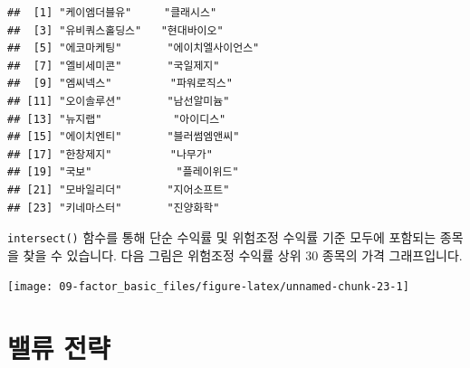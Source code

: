 \documentclass[12pt,]{book}
\newenvironment{Shaded}{\begin{snugshade}}{\end{snugshade}}
\newcommand{\DataTypeTok}[1]{\textcolor[rgb]{0.13,0.29,0.53}{#1}}
\newcommand{\KeywordTok}[1]{\textcolor[rgb]{0.13,0.29,0.53}{\textbf{#1}}}
\newcommand{\NormalTok}[1]{#1}
\newcommand{\OperatorTok}[1]{\textcolor[rgb]{0.81,0.36,0.00}{\textbf{#1}}}
\newcommand{\OtherTok}[1]{\textcolor[rgb]{0.56,0.35,0.01}{#1}}
\newcommand{\StringTok}[1]{\textcolor[rgb]{0.31,0.60,0.02}{#1}}
\begin{document}
\begin{verbatim}
##  [1] "케이엠더블유"     "클래시스"        
##  [3] "유비쿼스홀딩스"   "현대바이오"      
##  [5] "에코마케팅"       "에이치엘사이언스"
##  [7] "엘비세미콘"       "국일제지"        
##  [9] "엠씨넥스"         "파워로직스"      
## [11] "오이솔루션"       "남선알미늄"      
## [13] "뉴지랩"           "아이디스"        
## [15] "에이치엔티"       "블러썸엠앤씨"    
## [17] "한창제지"         "나무가"          
## [19] "국보"             "플레이위드"      
## [21] "모바일리더"       "지어소프트"      
## [23] "키네마스터"       "진양화학"
\end{verbatim}

\texttt{intersect()} 함수를 통해 단순 수익률 및 위험조정 수익률 기준 모두에 포함되는 종목을 찾을 수 있습니다. 다음 그림은 위험조정 수익률 상위 30 종목의 가격 그래프입니다.

\begin{Shaded}
\end{Shaded}

\begin{center}\texttt{[image: 09-factor\_basic\_files/figure-latex/unnamed-chunk-23-1]} \end{center}

\hypertarget{section-55}{%
\section{밸류 전략}\label{section-55}}
\end{document}
